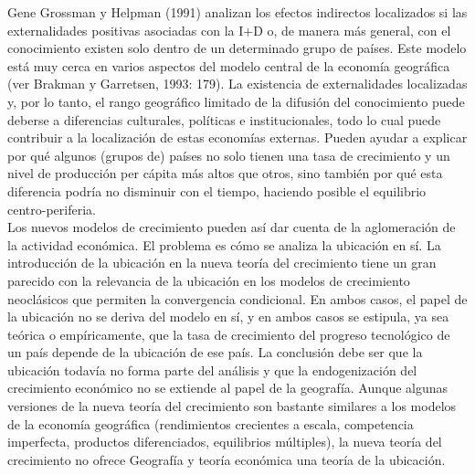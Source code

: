 Gene Grossman y Helpman (1991) analizan los efectos indirectos localizados si las externalidades positivas asociadas con la I+D o, de manera más general, con el conocimiento existen solo dentro de un determinado grupo de países. Este modelo está muy cerca en varios aspectos del modelo central de la economía geográfica (ver Brakman y Garretsen, 1993: 179). La existencia de externalidades localizadas y, por lo tanto, el rango geográfico limitado de la difusión del conocimiento puede deberse a diferencias culturales, políticas e institucionales, todo lo cual puede contribuir a la localización de estas economías externas. Pueden ayudar a explicar por qué algunos (grupos de) países no solo tienen una tasa de crecimiento y un nivel de producción per cápita más altos que otros, sino también por qué esta diferencia podría no disminuir con el tiempo, haciendo posible el equilibrio centro-periferia.\\
Los nuevos modelos de crecimiento pueden así dar cuenta de la aglomeración de la actividad económica. El problema es cómo se analiza la ubicación en sí. La introducción de la ubicación en la nueva teoría del crecimiento tiene un gran parecido con la relevancia de la ubicación en los modelos de crecimiento neoclásicos que permiten la convergencia condicional. En ambos casos, el papel de la ubicación no se deriva del modelo en sí, y en ambos casos se estipula, ya sea teórica o empíricamente, que la tasa de crecimiento del progreso tecnológico de un país depende de la ubicación de ese país. La conclusión debe ser que la ubicación todavía no forma parte del análisis y que la endogenización del crecimiento económico no se extiende al papel de la geografía. Aunque algunas versiones de la nueva teoría del crecimiento son bastante similares a los modelos de la economía geográfica (rendimientos crecientes a escala, competencia imperfecta, productos diferenciados, equilibrios múltiples), la nueva teoría del crecimiento no ofrece Geografía y teoría económica una teoría de la ubicación.\\\\
